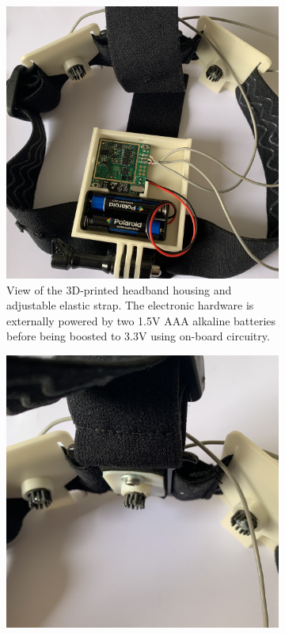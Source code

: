 \begin{figure}
     \begin{subfigure}[c]{0.48\textwidth}
         \centering
         \includegraphics[width=\textwidth]{final-headband}
         \caption{View of the 3D-printed headband housing and adjustable elastic strap. The electronic hardware is externally powered by two 1.5V AAA alkaline batteries before being boosted to 3.3V using on-board circuitry.}
         \label{fig:final-headband}
     \end{subfigure}
     \hfill
    \begin{subfigure}[c]{0.48\textwidth}
         \centering
         \includegraphics[width=\textwidth]{final-headband-elec}

\end{subfigure}
\end{figure}
